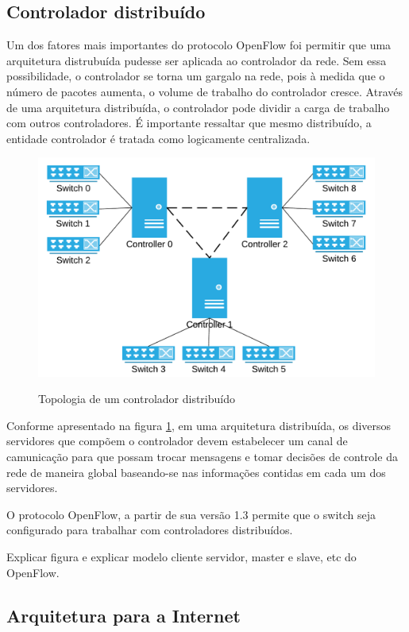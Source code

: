 \subsection{Controlador distribuído}

Um dos fatores mais importantes do protocolo OpenFlow foi permitir que 
uma arquitetura distrubuída pudesse ser aplicada ao controlador da rede.
Sem essa possibilidade, o controlador se torna um gargalo na rede, 
pois à medida que o número de pacotes aumenta, o volume de trabalho do 
controlador cresce. 
Através de uma arquitetura distribuída, o controlador pode dividir a carga 
de trabalho com outros controladores.
É importante ressaltar que mesmo distribuído, a entidade controlador
é tratada como logicamente centralizada.

\begin{figure}[h!]
    \centering
    \includegraphics{img/distributed-controller}
    \label{fig:distributed-controller}
    \caption{Topologia de um controlador distribuído}
\end{figure}

Conforme apresentado na figura \ref{fig:distributed-controller}, em uma
arquitetura distribuída, os diversos servidores que compõem o controlador
devem estabelecer um canal de camunicação para que possam trocar mensagens
e tomar decisões de controle da rede de maneira global baseando-se nas
informações contidas em cada um dos servidores.

O protocolo OpenFlow, a partir de sua versão 1.3 permite que o switch seja 
configurado para trabalhar com controladores distribuídos.

Explicar figura e explicar modelo cliente servidor, master e slave, etc do 
OpenFlow.


\subsection{Arquitetura para a Internet}
